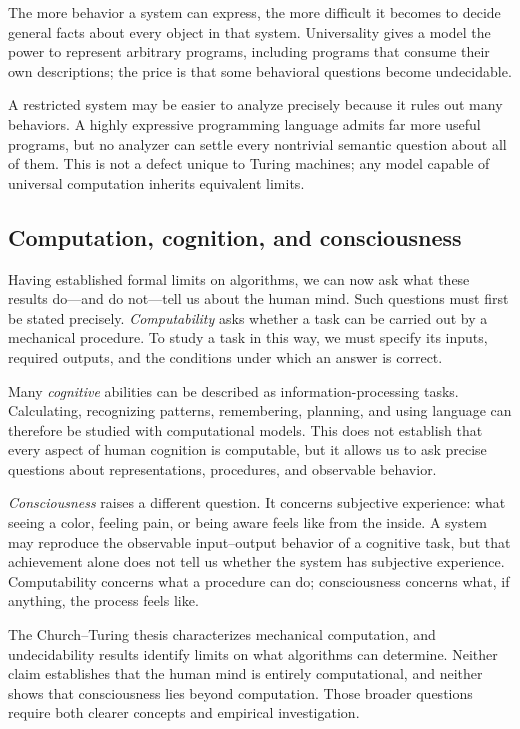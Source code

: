 \documentclass[11pt]{article}
\begin{document}
\begin{keyidea}
The more behavior a system can express, the more difficult it becomes to decide
general facts about every object in that system. Universality gives a model the
power to represent arbitrary programs, including programs that consume their
own descriptions; the price is that some behavioral questions become
undecidable.
\end{keyidea}

A restricted system may be easier to analyze precisely because it rules out
many behaviors. A highly expressive programming language admits far more useful
programs, but no analyzer can settle every nontrivial semantic question about
all of them. This is not a defect unique to Turing machines; any model capable
of universal computation inherits equivalent limits.

\subsection{Computation, cognition, and consciousness}

Having established formal limits on algorithms, we can now ask what these
results do---and do not---tell us about the human mind. Such questions must
first be stated precisely. \emph{Computability} asks whether a task can be
carried out by a mechanical procedure. To study a task in this way, we must
specify its inputs, required outputs, and the conditions under which an answer
is correct.

Many \emph{cognitive} abilities can be described as information-processing
tasks. Calculating, recognizing patterns, remembering, planning, and using
language can therefore be studied with computational models. This does not
establish that every aspect of human cognition is computable, but it allows us
to ask precise questions about representations, procedures, and observable
behavior.

\emph{Consciousness} raises a different question. It concerns subjective
experience: what seeing a color, feeling pain, or being aware feels like from
the inside. A system may reproduce the observable input--output behavior of a
cognitive task, but that achievement alone does not tell us whether the system
has subjective experience. Computability concerns what a procedure can do;
consciousness concerns what, if anything, the process feels like.

The Church--Turing thesis characterizes mechanical computation, and
undecidability results identify limits on what algorithms can determine.
Neither claim establishes that the human mind is entirely computational, and
neither shows that consciousness lies beyond computation. Those broader
questions require both clearer concepts and empirical investigation.
\end{document}

